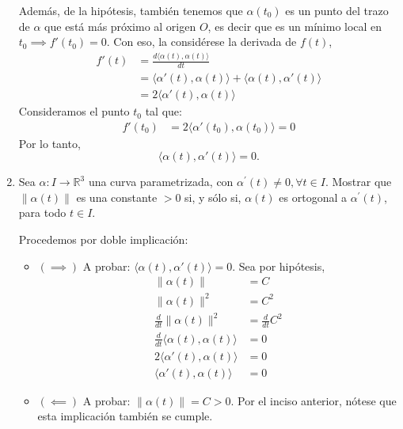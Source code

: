 \begin{problema}
\begin{enumerate}
\begin{sol}
                Además, de la hipótesis, también tenemos que $\alpha(t_0)$ es un punto del trazo de $\alpha$ que está más próximo al origen $O$, es decir que es un mínimo local en $t_0\implies f'(t_0)=0$. Con eso, la considérese la derivada de $f(t)$,
                \begin{align*}
                    f'(t)&=\frac{d\langle \alpha(t),\alpha(t)\rangle}{dt}\\
                         &= \langle \alpha'(t),\alpha(t)\rangle+\langle \alpha(t),\alpha'(t)\rangle\\
                         &= 2 \langle \alpha'(t),\alpha(t)\rangle
                \end{align*}
                Consideramos el punto $t_0$ tal que: 
                \begin{align*}
                    f'(t_0)&= 2 \langle \alpha'(t_0),\alpha(t_0)\rangle=0
                \end{align*}
                Por lo tanto, $$\langle\alpha(t), \alpha'(t)\rangle=0.$$
            \end{sol}
        \item Sea $\alpha: I \rightarrow \mathbb{R}^{3}$ una curva parametrizada, con $\alpha^{\prime}(t) \neq 0, \forall t \in I$. Mostrar que $\|\alpha(t)\|$ es una constante $>0$ si, y sólo si, $\alpha(t)$ es ortogonal a $\alpha^{\prime}(t)$, para todo $t \in I$.
        \begin{sol}
            Procedemos por doble implicación:
            \begin{itemize}
                \item $(\implies)$ A probar: $\langle\alpha(t),\alpha'(t)\rangle =0 $. Sea por hipótesis,
                \begin{align*}
                    \|\alpha(t)\|&= C\\
                    \|\alpha(t)\|^2&= C^2\\
                    \frac{d}{dt}\|\alpha(t)\|^2&= \frac{d}{dt}C^2\\
                    \frac{d}{dt}\langle\alpha(t),\alpha(t)\rangle &= 0\\
                    2 \langle \alpha'(t),\alpha(t)\rangle &=0\\
                    \langle \alpha'(t),\alpha(t)\rangle &=0
                \end{align*}
                
                \item $(\impliedby)$ A probar: $\|\alpha(t)\|=C>0.$ Por el inciso anterior, nótese que esta implicación también se cumple. 
            \end{itemize}
        \end{sol}
    \end{enumerate}
    
\end{problema}

